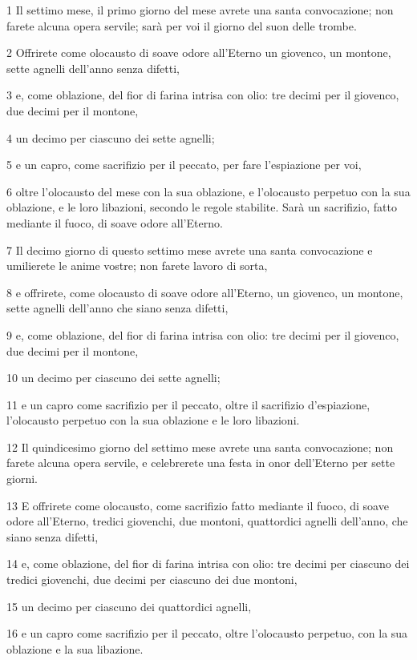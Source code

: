 \par 1 Il settimo mese, il primo giorno del mese avrete una santa convocazione; non farete alcuna opera servile; sarà per voi il giorno del suon delle trombe.
\par 2 Offrirete come olocausto di soave odore all'Eterno un giovenco, un montone, sette agnelli dell'anno senza difetti,
\par 3 e, come oblazione, del fior di farina intrisa con olio: tre decimi per il giovenco, due decimi per il montone,
\par 4 un decimo per ciascuno dei sette agnelli;
\par 5 e un capro, come sacrifizio per il peccato, per fare l'espiazione per voi,
\par 6 oltre l'olocausto del mese con la sua oblazione, e l'olocausto perpetuo con la sua oblazione, e le loro libazioni, secondo le regole stabilite. Sarà un sacrifizio, fatto mediante il fuoco, di soave odore all'Eterno.
\par 7 Il decimo giorno di questo settimo mese avrete una santa convocazione e umilierete le anime vostre; non farete lavoro di sorta,
\par 8 e offrirete, come olocausto di soave odore all'Eterno, un giovenco, un montone, sette agnelli dell'anno che siano senza difetti,
\par 9 e, come oblazione, del fior di farina intrisa con olio: tre decimi per il giovenco, due decimi per il montone,
\par 10 un decimo per ciascuno dei sette agnelli;
\par 11 e un capro come sacrifizio per il peccato, oltre il sacrifizio d'espiazione, l'olocausto perpetuo con la sua oblazione e le loro libazioni.
\par 12 Il quindicesimo giorno del settimo mese avrete una santa convocazione; non farete alcuna opera servile, e celebrerete una festa in onor dell'Eterno per sette giorni.
\par 13 E offrirete come olocausto, come sacrifizio fatto mediante il fuoco, di soave odore all'Eterno, tredici giovenchi, due montoni, quattordici agnelli dell'anno, che siano senza difetti,
\par 14 e, come oblazione, del fior di farina intrisa con olio: tre decimi per ciascuno dei tredici giovenchi, due decimi per ciascuno dei due montoni,
\par 15 un decimo per ciascuno dei quattordici agnelli,
\par 16 e un capro come sacrifizio per il peccato, oltre l'olocausto perpetuo, con la sua oblazione e la sua libazione.
